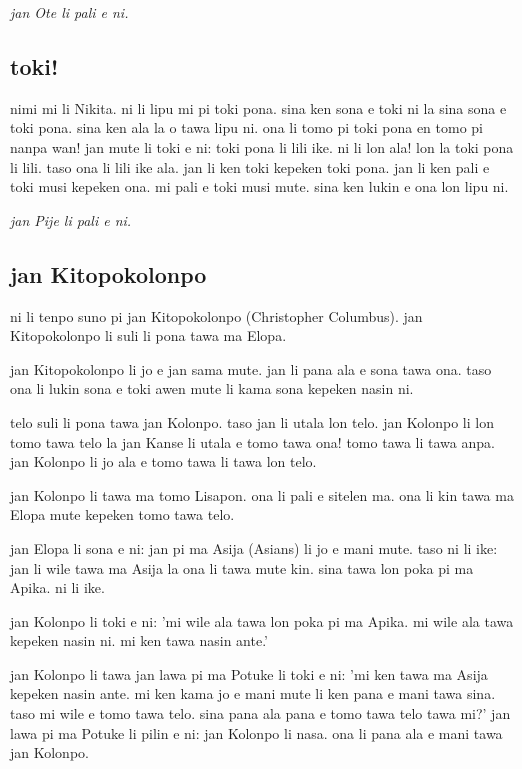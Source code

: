 \textit{jan Ote li pali e ni. \cite{www:sowelitoki:01}}
%
\subsection{toki!}

nimi mi li Nikita. 
ni li lipu mi pi toki pona. sina ken sona e toki ni la sina sona e toki pona. sina ken ala la o tawa lipu ni. ona li tomo pi toki pona en tomo pi nanpa wan! 
jan mute li toki e ni: toki pona li lili ike. ni li lon ala! lon la toki pona li lili. taso ona li lili ike ala. jan li ken toki kepeken toki pona. jan li ken pali e toki musi kepeken ona. 
mi pali e toki musi mute. sina ken lukin e ona lon lipu ni.

\textit{jan Pije li pali e ni. \cite{www:Pije:01}}
%
\newpage
\subsection{jan Kitopokolonpo}

ni li tenpo suno pi jan Kitopokolonpo (Christopher Columbus). 
jan Kitopokolonpo li suli li pona tawa ma Elopa.

jan Kitopokolonpo li jo e jan sama mute. 
jan li pana ala e sona tawa ona. 
taso ona li lukin sona e toki awen mute li kama sona kepeken nasin ni.

telo suli li pona tawa jan Kolonpo. 
taso jan li utala lon telo. 
jan Kolonpo li lon tomo tawa telo la jan Kanse li utala e tomo tawa ona!
tomo tawa li tawa anpa. jan Kolonpo li jo ala e tomo tawa li tawa lon
telo.

jan Kolonpo li tawa ma tomo Lisapon. ona li pali e sitelen ma. ona li
kin tawa ma Elopa mute kepeken tomo tawa telo.

jan Elopa li sona e ni: jan pi ma Asija (Asians) li jo e mani mute.
taso ni li ike: jan li wile tawa ma Asija la ona li tawa mute kin.
sina tawa lon poka pi ma Apika. ni li ike.

jan Kolonpo li toki e ni: 'mi wile ala tawa lon poka pi ma Apika. mi
wile ala tawa kepeken nasin ni. mi ken tawa nasin ante.'

jan Kolonpo li tawa jan lawa pi ma Potuke li toki e ni: 'mi ken tawa
ma Asija kepeken nasin ante. mi ken kama jo e mani mute li ken pana e
mani tawa sina. taso mi wile e tomo tawa telo. sina pana ala pana e
tomo tawa telo tawa mi?' jan lawa pi ma Potuke li pilin e ni: jan
Kolonpo li nasa. ona li pana ala e mani tawa jan Kolonpo.

